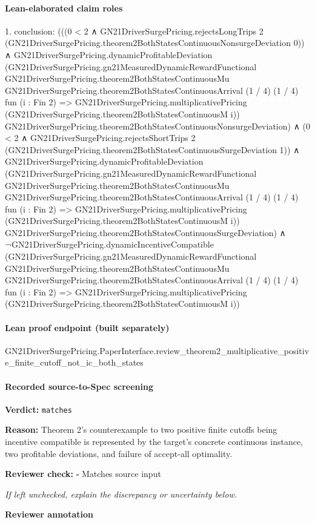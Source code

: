 \documentclass[10pt]{article}
\newcommand{\reviewerbox}{%
  \par\noindent\fbox{\parbox{0.96\linewidth}{\rule{0pt}{0.38in}}}\par
}
\newcommand{\reviewmatch}[1]{%
  \par\noindent\textbf{Reviewer check:} $\square$\; #1\par
  \noindent\emph{If left unchecked, explain the discrepancy or uncertainty below.}\par
}
\begin{document}
\paragraph{Lean-elaborated claim roles}\begin{ReviewVerbatim}
1. conclusion: (((0 < 2 ∧
        GN21DriverSurgePricing.rejectsLongTrips 2
          (GN21DriverSurgePricing.theorem2BothStatesContinuousNonsurgeDeviation 0)) ∧
      GN21DriverSurgePricing.dynamicProfitableDeviation
        (GN21DriverSurgePricing.gn21MeasuredDynamicRewardFunctional
          GN21DriverSurgePricing.theorem2BothStatesContinuousMu
          GN21DriverSurgePricing.theorem2BothStatesContinuousArrival (1 / 4) (1 / 4) fun (i : Fin 2) =>
          GN21DriverSurgePricing.multiplicativePricing (GN21DriverSurgePricing.theorem2BothStatesContinuousM i))
        GN21DriverSurgePricing.theorem2BothStatesContinuousNonsurgeDeviation) ∧
    (0 < 2 ∧
        GN21DriverSurgePricing.rejectsShortTrips 2
          (GN21DriverSurgePricing.theorem2BothStatesContinuousSurgeDeviation 1)) ∧
      GN21DriverSurgePricing.dynamicProfitableDeviation
        (GN21DriverSurgePricing.gn21MeasuredDynamicRewardFunctional
          GN21DriverSurgePricing.theorem2BothStatesContinuousMu
          GN21DriverSurgePricing.theorem2BothStatesContinuousArrival (1 / 4) (1 / 4) fun (i : Fin 2) =>
          GN21DriverSurgePricing.multiplicativePricing (GN21DriverSurgePricing.theorem2BothStatesContinuousM i))
        GN21DriverSurgePricing.theorem2BothStatesContinuousSurgeDeviation) ∧
  ¬GN21DriverSurgePricing.dynamicIncentiveCompatible
      (GN21DriverSurgePricing.gn21MeasuredDynamicRewardFunctional GN21DriverSurgePricing.theorem2BothStatesContinuousMu
        GN21DriverSurgePricing.theorem2BothStatesContinuousArrival (1 / 4) (1 / 4) fun (i : Fin 2) =>
        GN21DriverSurgePricing.multiplicativePricing (GN21DriverSurgePricing.theorem2BothStatesContinuousM i))
\end{ReviewVerbatim}

\paragraph{Lean proof endpoint (built separately)}\begin{ReviewVerbatim}
GN21DriverSurgePricing.PaperInterface.review_theorem2_multiplicative_positive_finite_cutoff_not_ic_both_states
\end{ReviewVerbatim}

\paragraph{Recorded source-to-Spec screening}
\textbf{Verdict:} \texttt{matches}
\\
{\raggedright
\textbf{Reason:} Theorem 2's counterexample to two positive finite cutoffs being incentive compatible is represented by the target's concrete continuous instance, two profitable deviations, and failure of accept-\allowbreak{}all optimality.\allowbreak{}
\par}
\reviewmatch{Matches source input}
\noindent\textbf{Reviewer annotation}\par
\reviewerbox
\clearpage
\hypertarget{source-claim-d0eae55048459432}{}
\hypertarget{source-section-e0bf42a2f186588f}{}
\end{document}
